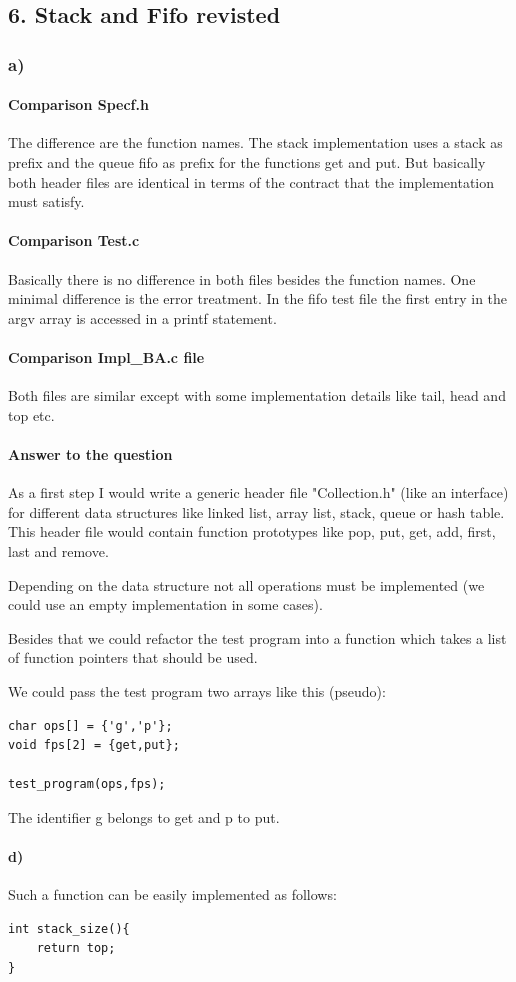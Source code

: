 \documentclass[12pt]{article}
\begin{document}
\subsection*{6. Stack and Fifo revisted}
\subsubsection*{a)}

\paragraph{Comparison Specf.h}
The difference are the function names. The stack implementation uses a stack as prefix and the queue fifo as prefix for the functions get and put. But basically both header files are identical in terms of the contract that the implementation must satisfy.

\paragraph{Comparison Test.c}
Basically there is no difference in both files besides the function names.
One minimal difference is the error treatment. In the fifo test file the first entry in the argv array is accessed in a printf statement.

\paragraph{Comparison Impl\_BA.c file}
Both files are similar except with some implementation details like tail, head and top etc.

\paragraph{Answer to the question}
As a first step I would write a generic header file "Collection.h" (like an interface) for different data structures like linked list, array list, stack, queue or hash table.
This header file would contain function prototypes like pop, put, get, add, first, last and remove.

Depending on the data structure not all operations must be implemented (we could use an empty implementation in some cases).

Besides that we could refactor the test program into a function which takes a list of function pointers that should be used.

We could pass the test program two arrays like this (pseudo):

\begin{lstlisting}
char ops[] = {'g','p'};
void fps[2] = {get,put};

test_program(ops,fps);
\end{lstlisting}

The identifier g belongs to get and p to put. 



\paragraph*{d)}
Such a function can be easily implemented as follows:
\begin{lstlisting}
int stack_size(){
	return top;
}
\end{lstlisting}
\end{document}
